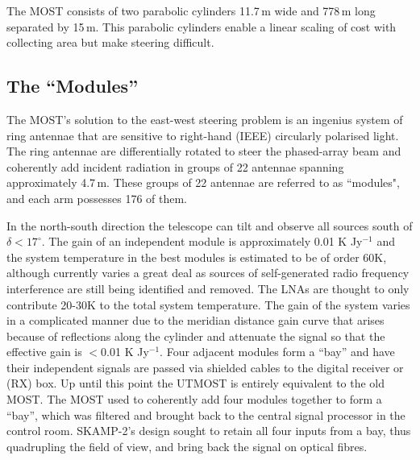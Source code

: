 
The MOST consists of two parabolic cylinders 11.7\,m wide and 778\,m long separated by 15\,m. This parabolic cylinders enable a linear scaling of cost with collecting area but make steering difficult.

\subsection{The ``Modules''}
The MOST's solution to the east-west steering problem is an ingenius system of ring antennae that are sensitive to right-hand (IEEE) circularly polarised light. The ring antennae are differentially rotated to steer the phased-array beam and coherently add incident radiation in groups of 22 antennae spanning approximately 4.7\,m. These groups of 22 antennae are referred to as ``modules", and each arm possesses 176 of them. 

In the north-south direction the telescope can tilt and observe all sources south of $\delta<17^\circ$. The gain of an independent module is approximately 0.01 K Jy$^{-1}$ and the system temperature in the best modules is estimated to be of order 60K, although currently varies a great deal as sources of self-generated radio frequency interference are still being identified and removed. The LNAs are thought to only contribute 20-30K to the total system temperature. The gain of the system varies in a complicated manner due to the meridian distance gain curve that arises because of reflections along the cylinder and attenuate the signal so that the effective gain is $<$0.01 K Jy$^{-1}$\cite{Hunstead_1996}.
Four adjacent modules form a ``bay'' and have their independent signals are passed via shielded cables to the digital receiver or (RX) box. Up until this point the UTMOST is entirely equivalent to the old MOST. The MOST used to coherently add four modules together to form a ``bay'', which was filtered and brought back to the central signal processor in the control room. SKAMP-2's design sought to retain all four inputs from a bay, thus quadrupling the field of view, and bring back the signal on optical fibres.
